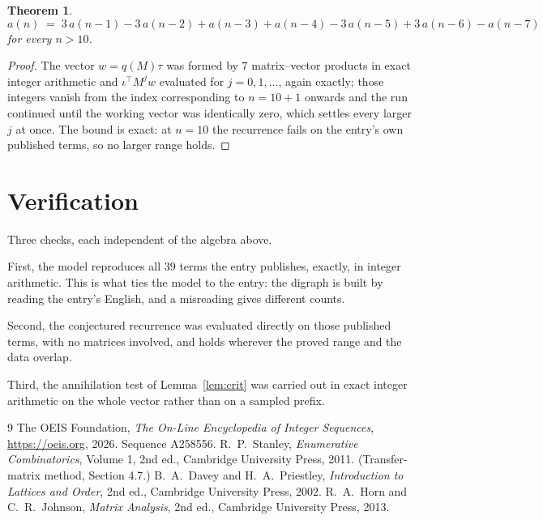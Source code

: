 \documentclass[11pt,a4paper]{article}
\theoremstyle{plain}
\newtheorem{theorem}{Theorem}
\theoremstyle{definition}
\begin{document}
\begin{theorem}
\[
a(n)\;=\;3\,a(n-1) - 3\,a(n-2) + a(n-3) + a(n-4) - 3\,a(n-5) + 3\,a(n-6) - a(n-7)
\]
for every $n>10$.
\end{theorem}

\begin{proof}
The vector $w=q(M)\tau$ was formed by $7$ matrix--vector products in exact integer
arithmetic and $\iota^{\!\top}M^{j}w$ evaluated for $j=0,1,\dots$, again exactly; those
integers vanish from the index corresponding to $n=10+1$ onwards and the run continued
until the working vector was identically zero, which settles every larger $j$ at once. The bound is exact: at $n=10$ the recurrence fails on the entry's own published terms, so no larger range holds.
\end{proof}

\section{Verification}

Three checks, each independent of the algebra above.

First, the model reproduces all $39$ terms the entry publishes, exactly, in integer
arithmetic. This is what ties the model to the entry: the digraph is built by reading the
entry's English, and a misreading gives different counts.

Second, the conjectured recurrence was evaluated directly on those published terms, with no
matrices involved, and holds wherever the proved range and the data overlap.

Third, the annihilation test of Lemma~\ref{lem:crit} was carried out in exact integer
arithmetic on the whole vector rather than on a sampled prefix.

\begin{thebibliography}{9}
 The OEIS Foundation, \emph{The On-Line Encyclopedia of Integer
Sequences}, \url{https://oeis.org}, 2026. Sequence A258556.
 R.~P.~Stanley, \emph{Enumerative Combinatorics}, Volume 1, 2nd ed.,
Cambridge University Press, 2011. (Transfer-matrix method, Section 4.7.)
 B.~A.~Davey and H.~A.~Priestley, \emph{Introduction to Lattices and
Order}, 2nd ed., Cambridge University Press, 2002.
 R.~A.~Horn and C.~R.~Johnson, \emph{Matrix Analysis}, 2nd ed., Cambridge
University Press, 2013.
\end{thebibliography}
\end{document}
